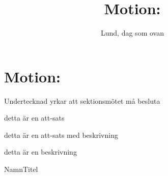 \documentclass[nopdfbookmarks,a4paper, 11pt, twoside]{article}
\title{Motion: \TITLE}
\newcommand{\TITLE}{} %
\newcommand{\TEXT}{} %
\newcommand{\UNDER}{Undertecknad yrkar att sektionsmötet må besluta}
\newcommand{\ATT}[1]{\item #1}
\newcommand{\ATTDESC}[2]{\item #1 \begin{description} \item #2 \end{description}}
\begin{document}
\section*{Motion: \TITLE}

\TEXT

\UNDER

\begin{attlista}
	\ATT{detta är en att-sats} %
	\ATTDESC{detta är en att-sats med beskrivning}{detta är en beskrivning}
	
\end{attlista}

\signature{Lund, dag som ovan}{Namn}{Titel}
\end{document}
